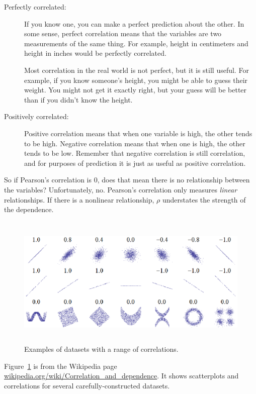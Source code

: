 \documentclass[12pt]{book}
\begin{document}
\begin{description}

\item[Perfectly correlated:] If 
you know one, you can make a perfect prediction about the other.
In some sense, perfect correlation means that the variables are two
measurements of the same thing.  For example, height in centimeters and
height in inches would be perfectly correlated.

Most correlation in the real world is not perfect, but it
is still useful.  For example, if you know someone's height, you might
be able to guess their weight.  You might not get it exactly right, but
your guess will be better than if you didn't know the height.

\item[Positively correlated:] Positive correlation means that when one
  variable is high, the other tends to be high.  Negative correlation
  means that when one is high, the other tends to be low.  Remember that
  negative correlation is still correlation, and for purposes of
  prediction it is just as useful as positive correlation.

\end{description}

So if Pearson's correlation is 0, does that mean there is no
relationship between the variables?  Unfortunately, no.  Pearson's
correlation only measures {\em linear} relationships.  If there is a
nonlinear relationship, $\rho$ understates the strength of the
dependence.

\begin{figure}
\centerline{\includegraphics[height=2.5in]{figs/Correlation_examples.eps}}
\caption{Examples of datasets with a range of correlations.}
\label{corr_examples}
\end{figure}

Figure~\ref{corr_examples} is from the Wikipedia page
\url{wikipedia.org/wiki/Correlation_and_dependence}.  It shows
scatterplots and correlations for several carefully-constructed
datasets.
\end{document}
